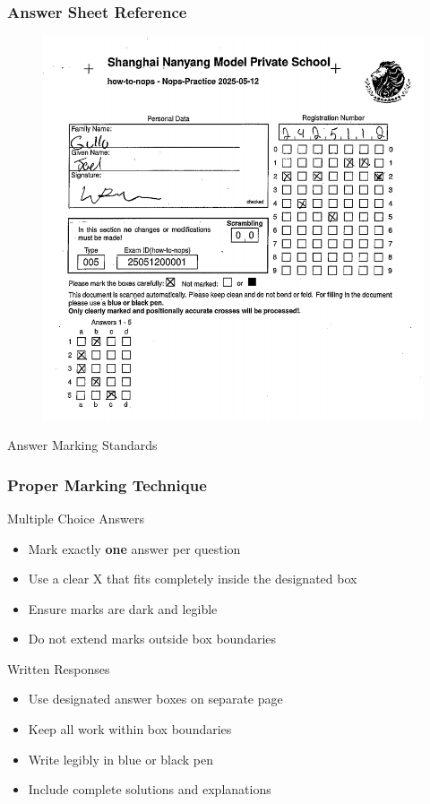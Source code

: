 \documentclass{beamer}
\begin{document}
\begin{frame}
\frametitle{Answer Sheet Reference}
\begin{figure}
    \centering
    \includegraphics[width=0.5\linewidth]{phys11-exam-prep-nops-answer-sheet.png}
\end{figure}
\end{frame}

\begin{frame}{Answer Marking Standards}
\frametitle{Proper Marking Technique}
\begin{block}{Multiple Choice Answers}
\begin{itemize}
\item Mark exactly \textbf{one} answer per question
\item Use a clear X that fits completely inside the designated box
\item Ensure marks are dark and legible
\item Do not extend marks outside box boundaries
\end{itemize}
\end{block}

\begin{block}{Written Responses}
\begin{itemize}
\item Use designated answer boxes on separate page
\item Keep all work within box boundaries
\item Write legibly in blue or black pen
\item Include complete solutions and explanations
\end{itemize}
\end{block}
\end{frame}
\end{document}
